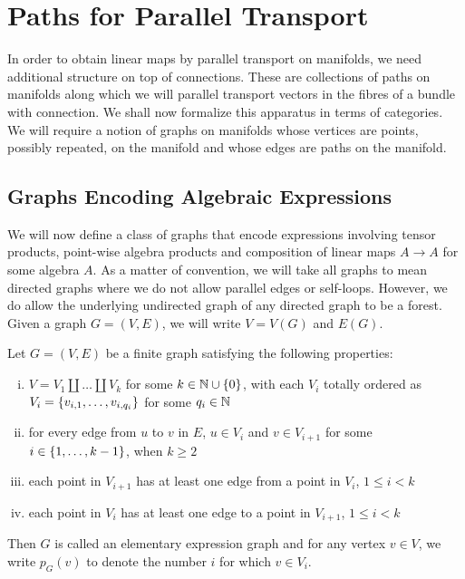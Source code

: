 \documentclass[./Thick_TQFTs_and_Quantum_Information.tex]{subfiles}
\begin{document}
\section{Paths for Parallel Transport}

In order to obtain linear maps by parallel transport on manifolds, we need
additional structure on top of connections. These are collections of paths on
manifolds along which we will parallel transport vectors in the fibres of a
bundle with connection. We shall now formalize this apparatus in terms of
categories. We will require a notion of graphs on manifolds whose vertices are
points, possibly repeated, on the manifold and whose edges are paths on the
manifold.

\subsection{Graphs Encoding Algebraic Expressions}

We will now define a class of graphs that encode expressions involving tensor
products, point-wise algebra products and composition of linear maps $A \to A$
for some algebra $A$. As a matter of convention, we will take all graphs to mean
directed graphs where we do not allow parallel edges or self-loops. However, we
do allow the underlying undirected graph of any directed graph to be a forest.
Given a graph $G = (V, E)$, we will write $V = V(G)$ and $E(G)$.

\begin{defn}\label{eeg}
Let $G = (V, E)$ be a finite graph satisfying the following properties:
\begin{enumerate}[(i)]

\setlength{\itemsep}{0pt}

\item \label{eeg:part}
$V = V_1 \amalg \dots \amalg V_k$ for some $k \in \N \cup \set{0}$, with each
$V_i$ totally ordered as $V_i = \set{v_{i, 1}, \dots, v_{i, q_i}}$ for some
$q_i \in \mathbb{N}$

\item \label{eeg:forward}
for every edge from $u$ to $v$ in $E$, $u \in V_i$ and
$v \in V_{i + 1}$ for some $i \in \set{1, \dots, k - 1}$, when $k \geq 2$

\item \label{eeg:nonredright}
each point in $V_{i + 1}$ has at least one edge from a point in $V_{i}$,
$1 \leq i < k$

\item \label{eeg:nonredleft}
each point in $V_{i}$ has at least one edge to a point in $V_{i + 1}$,
$1 \leq i < k$

\end{enumerate}
Then $G$ is called an elementary expression graph and for any vertex $v \in V$,
we write $p_{G}(v)$ to denote the number $i$ for which $v \in V_i$.
\end{defn}
\end{document}
